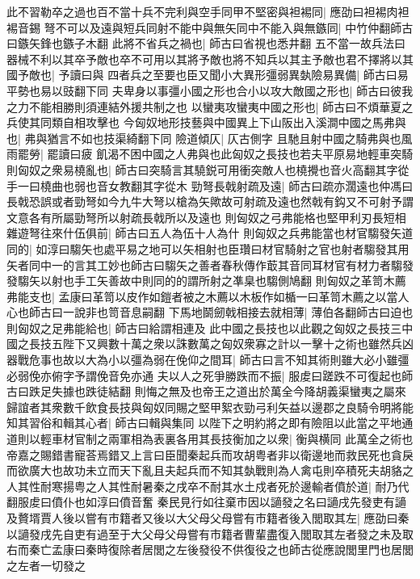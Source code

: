 此不習勒卒之過也百不當十兵不完利與空手同甲不堅密與袒裼同|{
	應劭曰袒裼肉袒裼音錫}
弩不可以及遠與短兵同射不能中與無矢同中不能入與無鏃同|{
	中竹仲翻師古曰鏃矢鋒也鏃子木翻}
此將不省兵之禍也|{
	師古曰省視也悉井翻}
五不當一故兵法曰器械不利以其卒予敵也卒不可用以其將予敵也將不知兵以其主予敵也君不擇將以其國予敵也|{
	予讀曰與}
四者兵之至要也臣又聞小大異形彊弱異埶險易異備|{
	師古曰易平勢也易以豉翻下同}
夫卑身以事彊小國之形也合小以攻大敵國之形也|{
	師古曰彼我之力不能相勝則須連結外援共制之也}
以蠻夷攻蠻夷中國之形也|{
	師古曰不煩華夏之兵使其同類自相攻擊也}
今匈奴地形技藝與中國異上下山阪出入溪澗中國之馬弗與也|{
	弗與猶言不如也技渠綺翻下同}
險道傾仄|{
	仄古側字}
且馳且射中國之騎弗與也風雨罷勞|{
	罷讀曰疲}
飢渴不困中國之人弗與也此匈奴之長技也若夫平原易地輕車突騎則匈奴之衆易橈亂也|{
	師古曰突騎言其驍鋭可用衝突敵人也橈攪也音火高翻其字從手一曰橈曲也弱也音女教翻其字從木}
勁弩長戟射疏及遠|{
	師古曰疏亦濶遠也仲馮曰長戟恐誤或者勁弩如今九牛大弩以槍為矢歟故可射疏及遠也然戟有鈎又不可射予謂文意各有所屬勁弩所以射疏長戟所以及遠也}
則匈奴之弓弗能格也堅甲利刃長短相雜遊弩往來什伍俱前|{
	師古曰五人為伍十人為什}
則匈奴之兵弗能當也材官騶發矢道同的|{
	如淳曰騶矢也處平易之地可以矢相射也臣瓚曰材官騎射之官也射者騶發其用矢者同中一的言其工妙也師古曰騶矢之善者春秋傳作菆其音同耳材官有材力者騶發發騶矢以射也手工矢善故中則同的的謂所射之凖臬也騶側鳩翻}
則匈奴之革笥木薦弗能支也|{
	孟康曰革笥以皮作如鎧者被之木薦以木板作如楯一曰革笥木薦之以當人心也師古曰一說非也笥音息嗣翻}
下馬地鬬劒戟相接去就相薄|{
	薄伯各翻師古曰迫也}
則匈奴之足弗能給也|{
	師古曰給謂相連及}
此中國之長技也以此觀之匈奴之長技三中國之長技五陛下又興數十萬之衆以誅數萬之匈奴衆寡之計以一擊十之術也雖然兵凶器戰危事也故以大為小以彊為弱在俛仰之間耳|{
	師古曰言不知其術則雖大必小雖彊必弱俛亦俯字予謂俛音免亦通}
夫以人之死爭勝跌而不振|{
	服䖍曰蹉跌不可復起也師古曰跌足失據也跌徒結翻}
則悔之無及也帝王之道出於萬全今降胡義渠蠻夷之屬來歸誼者其衆數千飲食長技與匈奴同賜之堅甲絮衣勁弓利矢益以邊郡之良騎令明將能知其習俗和輯其心者|{
	師古曰輯與集同}
以陛下之明約將之即有險阻以此當之平地通道則以輕車材官制之兩軍相為表裏各用其長技衡加之以衆|{
	衡與横同}
此萬全之術也帝嘉之賜錯書寵荅焉錯又上言曰臣聞秦起兵而攻胡粤者非以衛邊地而救民死也貪戾而欲廣大也故功未立而天下亂且夫起兵而不知其埶戰則為人禽屯則卒積死夫胡貉之人其性耐寒揚粤之人其性耐暑秦之戌卒不耐其水土戍者死於邊輸者僨於道|{
	耐乃代翻服䖍曰僨仆也如淳曰僨音奮}
秦民見行如往棄市因以讁發之名曰讁戌先發吏有讁及贅壻賈人後以嘗有市籍者又後以大父母父母嘗有市籍者後入閭取其左|{
	應劭曰秦以讁發戌先自吏有過至于大父母父母嘗有市籍者曹輩盡復入閭取其左者發之未及取右而秦亡孟康曰秦時復除者居閭之左後發役不供復役之也師古從應說閭里門也居閭之左者一切發之}
